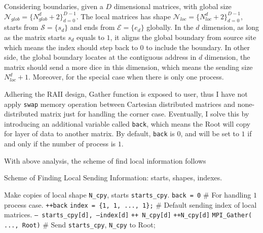Considering boundaries, given a $D$ dimensional matrices, with global size $\mathcal{N}_{glob} = \{N_{glob}^d + 2\}_{d = 0}^{D-1}$.
The local matrices has shape $\mathcal{N}_{loc} = \{N_{loc}^d+2\}_{d=0}^{D-1}$, starts from $\mathcal{S} = \{s_d\}$ and ends from $\mathcal{E} = \{e_d\}$ globally.
In the $d$ dimension, as long as the matrix starts $s_d$ equals to $1$, it aligns the global boundary from source site which means the index should step back to $0$ to 
include the boundary. 
In other side, the global boundary locates at the contiguous address in $d$ dimension, 
the matrix should send a more dice in this dimension, which means the sending size $N_{loc}^{d} + 1$.
Moreover, for the special case when there is only one process. 

Adhering the RAII design, Gather function is exposed to user, thus I have not apply \texttt{swap} memory operation between Cartesian distributed matrices and none-distributed matrix just 
for handling the corner case. 
Eventually, I solve this by introducing an additional variable called \texttt{back}, which means the Root will copy for layer of data to another matrix. 
By default, \texttt{back} is $0$, and will be set to $1$ if and only if the number of process is $1$. 

With above analysis, the scheme of find local information follows 
\begin{algorithm}
  \caption{Scheme of Finding Local Sending Information: starts, shapes, indexes.}
  \label{ALG:SCHEME:Find_LOCAL_SEND_INFO}
  \begin{algorithmic}[1]
    \STATE Make copies of local shape \texttt{N\_cpy}, starts \texttt{starts\_cpy}.
    \STATE \texttt{back = 0}                           \hfill \# For handling $1$ process case.
      \STATE \texttt{++back}
    \ENDIF
    \STATE \texttt{index = \{1, 1, ..., 1\};}  \hfill \# Default sending index of local matrices.
        \STATE \texttt{-- starts\_cpy[d], --index[d]}
        \STATE \texttt{++ N\_cpy[d]}
      \ENDIF
        \STATE \texttt{++N\_cpy[d]}
      \ENDIF
      \STATE \texttt{MPI\_Gather( ..., Root)}  \hfill \# Send \texttt{starts\_cpy}, \texttt{N\_cpy} to Root;
    \ENDFOR
  \end{algorithmic}
\end{algorithm}

